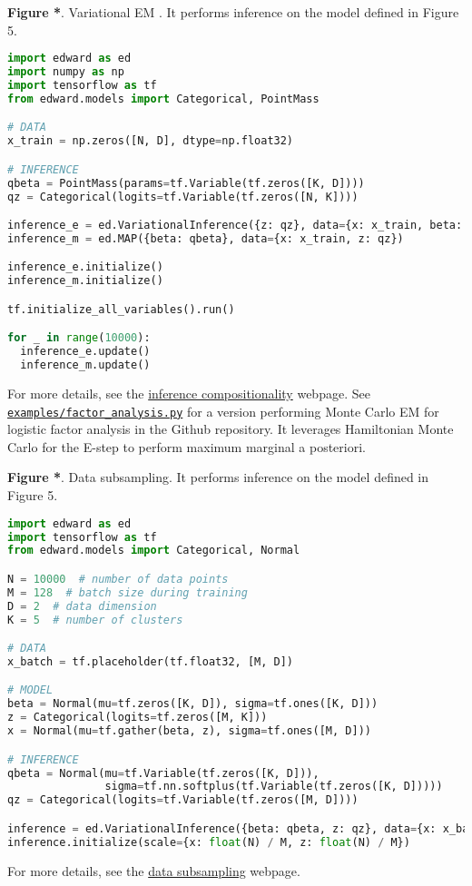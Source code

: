 \textbf{Figure *}. Variational EM \citep{neal1993new}.
It performs inference on the model defined in Figure 5.
\begin{lstlisting}[language=python]
import edward as ed
import numpy as np
import tensorflow as tf
from edward.models import Categorical, PointMass

# DATA
x_train = np.zeros([N, D], dtype=np.float32)

# INFERENCE
qbeta = PointMass(params=tf.Variable(tf.zeros([K, D])))
qz = Categorical(logits=tf.Variable(tf.zeros([N, K])))

inference_e = ed.VariationalInference({z: qz}, data={x: x_train, beta: qbeta})
inference_m = ed.MAP({beta: qbeta}, data={x: x_train, z: qz})

inference_e.initialize()
inference_m.initialize()

tf.initialize_all_variables().run()

for _ in range(10000):
  inference_e.update()
  inference_m.update()
\end{lstlisting}
For more details, see the
\href{/api/inference-compositionality}{inference compositionality} webpage.
See
\href{https://github.com/blei-lab/edward/blob/master/examples/factor_analysis.py}{\texttt{examples/factor_analysis.py}} for
a version performing Monte Carlo EM for logistic factor analysis
in the Github repository.
It leverages Hamiltonian Monte Carlo for the E-step to perform maximum
marginal a posteriori.

\textbf{Figure *}. Data subsampling.
It performs inference on the model defined in Figure 5.
\begin{lstlisting}[language=python]
import edward as ed
import tensorflow as tf
from edward.models import Categorical, Normal

N = 10000  # number of data points
M = 128  # batch size during training
D = 2  # data dimension
K = 5  # number of clusters

# DATA
x_batch = tf.placeholder(tf.float32, [M, D])

# MODEL
beta = Normal(mu=tf.zeros([K, D]), sigma=tf.ones([K, D]))
z = Categorical(logits=tf.zeros([M, K]))
x = Normal(mu=tf.gather(beta, z), sigma=tf.ones([M, D]))

# INFERENCE
qbeta = Normal(mu=tf.Variable(tf.zeros([K, D])),
               sigma=tf.nn.softplus(tf.Variable(tf.zeros([K, D]))))
qz = Categorical(logits=tf.Variable(tf.zeros([M, D])))

inference = ed.VariationalInference({beta: qbeta, z: qz}, data={x: x_batch})
inference.initialize(scale={x: float(N) / M, z: float(N) / M})
\end{lstlisting}
For more details, see the
\href{/api/inference-data-subsampling}{data subsampling} webpage.

